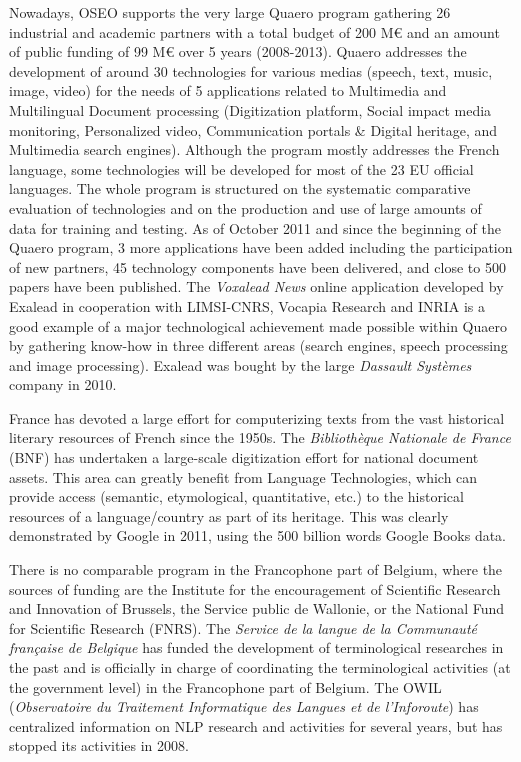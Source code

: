 \begin{multicols}{2}
Nowadays, OSEO supports the very large Quaero program gathering 26
industrial and academic partners with a total budget of 200 M€ and an
amount of public funding of 99 M€ over 5 years (2008-2013). Quaero
addresses the development of around 30 technologies for various medias
(speech, text, music, image, video) for the needs of 5 applications
related to Multimedia and Multilingual Document processing
(Digitization platform, Social impact media monitoring, Personalized
video, Communication portals \& Digital heritage, and Multimedia search
engines). Although the program mostly addresses the French language,
some technologies will be developed for most of the 23 EU official
languages. The whole program is structured on the systematic
comparative evaluation of technologies and on the production and use
of large amounts of data for training and testing. As of October 2011
and since the beginning of the Quaero program, 3 more applications
have been added including the participation of new partners, 45
technology components have been delivered, and close to 500 papers
have been published. The {\em Voxalead News} online application developed by
Exalead in cooperation with LIMSI-CNRS, Vocapia Research and INRIA is
a good example of a major technological achievement made possible
within Quaero by gathering know-how in three different areas (search
engines, speech processing and image processing). Exalead was bought
by the large {\em Dassault Systèmes} company in 2010.

France has devoted a large effort for computerizing texts from the
vast historical literary resources of French since the 1950s. The
{\em Bibliothèque Nationale de France} (BNF) has undertaken a large-scale
digitization effort for national document assets. This area can
greatly benefit from Language Technologies, which can provide access
(semantic, etymological, quantitative, etc.) to the historical
resources of a language/country as part of its heritage. This was
clearly demonstrated by Google in 2011, using the 500 billion words
Google Books data.

There is no comparable program in the Francophone part of Belgium,
where the sources of funding are the Institute for the encouragement
of Scientific Research and Innovation of Brussels, the Service public
de Wallonie, or the National Fund for Scientific Research (FNRS). The
{\em Service de la langue de la Communauté française de Belgique} has funded
the development of terminological researches in the past and is
officially in charge of coordinating the terminological activities (at
the government level) in the Francophone part of Belgium. The OWIL
({\em Observatoire du Traitement Informatique des Langues et de
l'Inforoute}) has centralized information on NLP research and
activities for several years, but has stopped its activities in 2008.


\end{multicols}
